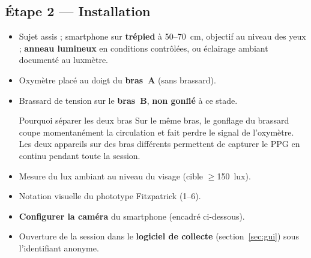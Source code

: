 \documentclass[11pt,a4paper]{article}
\begin{document}
\subsection{Étape 2 --- Installation}
\begin{itemize}
\item Sujet assis ; smartphone sur \textbf{trépied} à 50--70~cm, objectif au
niveau des yeux ; \textbf{anneau lumineux} en conditions contrôlées, ou éclairage
ambiant documenté au luxmètre.
\item Oxymètre placé au doigt du \textbf{bras~A} (sans brassard).
\item Brassard de tension sur le \textbf{bras~B}, \textbf{non gonflé} à ce stade.

\begin{warnbox}{Pourquoi séparer les deux bras}
Sur le même bras, le gonflage du brassard coupe momentanément la circulation et
fait perdre le signal de l'oxymètre. Les deux appareils sur des bras différents
permettent de capturer le PPG en continu pendant toute la session.
\end{warnbox}

\item Mesure du lux ambiant au niveau du visage (cible $\geq$150~lux).
\item Notation visuelle du phototype Fitzpatrick (1--6).
\item \textbf{Configurer la caméra} du smartphone (encadré ci-dessous).
\item Ouverture de la session dans le \textbf{logiciel de collecte}
(section~\ref{sec:gui}) sous l'identifiant anonyme.
\end{itemize}
\end{document}
